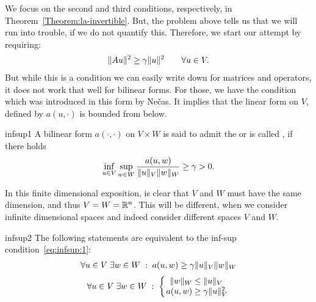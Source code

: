 \begin{intro}
  We focus on the second and third conditions, respectively, in
  Theorem~\ref{Theorem:la-invertible}.
  But, the problem above tells us that we
  will run into trouble, if we do not quantify this. Therefore, we
  start our attempt by requiring:
  \begin{gather*}
    \lVert Au\rVert^2 \ge \gamma \lVert u\rVert^2 \qquad\forall u\in V.
  \end{gather*}
  But while this is a condition we can easily write down for matrices
  and operators, it does not work that well for bilinear forms. For
  those, we have the condition which was introduced in this form by
  Nečas. It implies that the linear form on $V$, defined by $a(u,\cdot)$
  is bounded from below.
\end{intro}

\begin{Definition}{infsup1}
  A bilinear form $a(\cdot,\cdot)$ on $V\times W$ is said to admit the
   or is called , if
  there holds
  \begin{gather}
    \label{eq:infsup:1}
    \inf_{u\in V} \sup_{w\in W} \frac{a(u,w)}{\lVert u\rVert_V\lVert w\rVert_W}
    \ge \gamma > 0.
  \end{gather}
\end{Definition}

\begin{remark}
  In this finite dimensional exposition, is clear that $V$ and $W$
  must have the same dimension, and thus $V=W=\mathbb R^n$. This will be
  different, when we consider infinite dimensional spaces and indeed
  consider different spaces $V$ and $W$.
\end{remark}

\begin{Lemma}{infsup2}
  The following statements are equivalent to the inf-sup
  condition~\eqref{eq:infsup:1}:
  \begin{gather}
    \label{eq:infsup:2}
    \forall u\in V \;\exists w\in W \;:\; a(u,w) \ge \gamma \lVert u\rVert_V\lVert w\rVert_W
  \end{gather}
  \begin{gather}
    \label{eq:infsup:3}
    \forall u\in V
    \;\exists w\in W \;:\;
    \left\{
    \arraycolsep0.3ex
    \begin{array}{rcl}
      \norm{w}_W &\le&\norm{u}_V\\
      a(u,w) &\ge& \gamma \norm{u}_V^2
    \end{array}
    \right.
  \end{gather}
\end{Lemma}

